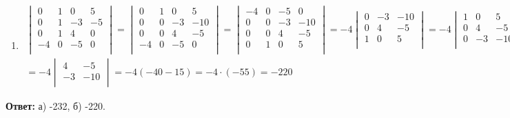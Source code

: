 \begin{enumerate}
		
		\item 
			\begin{gather*}
				\begin{vmatrix}
					0 & 1 & 0 & 5\\
					0 & 1 & -3 & -5\\
					0 & 1 & 4 & 0\\
					-4 & 0 & -5 & 0\\
				\end{vmatrix}
				 = 
				\begin{vmatrix}
					0 & 1 & 0 & 5\\
					0 & 0 & -3 & -10\\
					0 & 0 & 4 & -5\\
					-4 & 0 & -5 & 0\\
				\end{vmatrix}
				 = 
				\begin{vmatrix}
					-4 & 0 & -5 & 0\\
					0 & 0 & -3 & -10\\
					0 & 0 & 4 & -5\\
					0 & 1 & 0 & 5\\
				\end{vmatrix}
				= -4
				\begin{vmatrix}
					0 & -3 & -10\\
					0 & 4 & -5\\
					1 & 0 & 5\\
				\end{vmatrix}
				= -4
				\begin{vmatrix}
					1 & 0 & 5\\
					0 & 4 & -5\\
					0 & -3 & -10\\
				\end{vmatrix}
				\\
				= -4
				\begin{vmatrix}
					4 & -5\\
					-3 & -10\\
				\end{vmatrix} 
				= -4(-40 - 15) = -4 \cdot (-55) = -220
			\end{gather*}
		\end{enumerate}		
		\textbf{Ответ:} а) -232, б) -220.
		
		 
		
